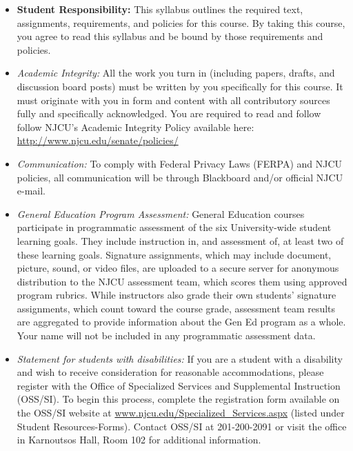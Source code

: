 \documentclass[article,oneside]{memoir}
\begin{document}
\begin{itemize}

\item \textbf{Student Responsibility:} This syllabus outlines the required text, assignments, requirements, and policies for this course. By taking this course, you agree to read this syllabus and be bound by those requirements and policies. 

 \item \textit{Academic Integrity:} All the work you turn in (including papers, drafts, and discussion board posts) must be written by you specifically for this course. It must originate with you in form and content with all contributory sources fully and specifically acknowledged. You are required to read and follow follow NJCU's Academic Integrity Policy available here: \href{http://www.njcu.edu/senate/policies/}{http://www.njcu.edu/senate/policies/} 

\item \textit{Communication:} To comply with Federal Privacy Laws (FERPA) and NJCU policies, all communication will be through Blackboard and/or official NJCU e-mail. 

\item \textit{General Education Program Assessment:} General Education courses participate in programmatic assessment of the six University-wide student learning goals. They include instruction in, and assessment of, at least two of these learning goals. Signature assignments, which may include document, picture, sound, or video files, are uploaded to a secure server for anonymous distribution to the NJCU assessment team, which scores them using approved program rubrics. While instructors also grade their own students’ signature assignments, which count toward the course grade, assessment team results are aggregated to provide information about the Gen Ed program as a whole. Your name will not be included in any programmatic assessment data.

\item \textit{Statement for students with disabilities:} If you are a student with a disability and wish to receive consideration for reasonable accommodations, please register with the Office of Specialized Services and Supplemental Instruction (OSS/SI). To begin this process, complete the registration form available on the OSS/SI website at
\href{http://www.njcu.edu/Specialized_Services.aspx}{www.njcu.edu/Specialized\_Services.aspx}
(listed under Student Resources-Forms). Contact OSS/SI at 201-200-2091
or visit the office in Karnoutsos Hall, Room 102 for additional
information.


\end{itemize}
\end{document}
